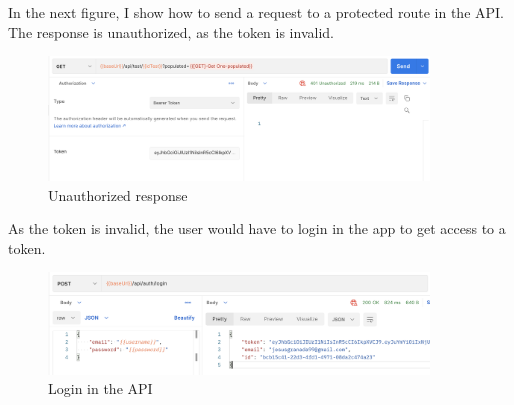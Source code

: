             In the next figure, I show how to send a request to a protected route in the API. The response is unauthorized, as the token is invalid. \\
            \begin{figure}[H]
                \centering
                    \includegraphics[width=0.9\textwidth]{assets/unauthorized.png}
                \caption{Unauthorized response}
                \label{fig:user_unauthorized}
            \end{figure}

            As the token is invalid, the user would have to login in the app to get access to a token. \\
            \begin{figure}[H]
                \centering
                    \includegraphics[width=0.9\textwidth]{assets/login.png}
                \caption{Login in the API}
                \label{fig:user_login_api}
            \end{figure}

